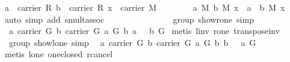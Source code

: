 \begin{isabellebody}
{\isachardoublequoteopen}{\isacharbrackleft}{\isacharbar}\ a\ {\isasymin}\ carrier\ R{\isacharsemicolon}\ b\ {\isasymin}\ carrier\ R{\isacharsemicolon}\ x\ {\isasymin}\ carrier\ M\ {\isacharbar}{\isacharbrackright}\ {\isacharequal}{\isacharequal}{\isachargreater}\isanewline
\ \ \ \ \ \ a\ {\isasymodot}\isactrlbsub M\isactrlesub \ {\isacharparenleft}b\ {\isasymodot}\isactrlbsub M\isactrlesub \ x{\isacharparenright}\ {\isacharequal}\ {\isacharparenleft}a\ {\isasymotimes}\ b{\isacharparenright}\ {\isasymodot}\isactrlbsub M\isactrlesub \ x\ {\isachardoublequoteclose}\isanewline
%
\isadelimproof
%
\endisadelimproof
%
\isatagproof
{}\isamarkupfalse%
\ {\isacharparenleft}auto\ simp\ add{\isacharcolon}\ smult{\isacharunderscore}assoc{}{\isacharparenright}%
\endisatagproof
{\isafoldproof}%
%
\isadelimproof
\isanewline
%
\endisadelimproof
\ \ \ \ \ \ \ \ \ \ \ \ \ \isanewline
\isanewline
{}\isamarkupfalse%
\ {\isacharparenleft}\ group{\isacharparenright}\ show{\isacharunderscore}r{\isacharunderscore}one\ {\isacharbrackleft}simp{\isacharbrackright}{\isacharcolon}\isanewline
\ \ {\isachardoublequoteopen}{\isasymlbrakk}a{\isasymin}\ carrier\ G{\isacharsemicolon}\ b{\isasymin}\ carrier\ G{\isasymrbrakk}{\isasymLongrightarrow}\ {\isacharparenleft}a\ {\isasymotimes}\isactrlbsub G\isactrlesub \ b{\isacharequal}\ a{\isacharparenright}\ {\isacharequal}\ {\isacharparenleft}\ b{\isacharequal}\ {\isasymone}\isactrlbsub G\isactrlesub {\isacharparenright}{\isachardoublequoteclose}\isanewline
%
\isadelimproof
%
\endisadelimproof
%
\isatagproof
{}\isamarkupfalse%
\ {\isacharparenleft}metis\ l{\isacharunderscore}inv\ r{\isacharunderscore}one\ transpose{\isacharunderscore}inv{\isacharparenright}%
\endisatagproof
{\isafoldproof}%
%
\isadelimproof
\isanewline
%
\endisadelimproof
\isanewline
\isanewline
{}\isamarkupfalse%
\ {\isacharparenleft}\ group{\isacharparenright}\ show{\isacharunderscore}l{\isacharunderscore}one\ {\isacharbrackleft}simp{\isacharbrackright}{\isacharcolon}\isanewline
\ \ {\isachardoublequoteopen}{\isasymlbrakk}a{\isasymin}\ carrier\ G{\isacharsemicolon}\ b{\isasymin}\ carrier\ G{\isasymrbrakk}{\isasymLongrightarrow}\ {\isacharparenleft}a\ {\isasymotimes}\isactrlbsub G\isactrlesub \ b{\isacharequal}\ b{\isacharparenright}\ {\isacharequal}\ {\isacharparenleft}\ a{\isacharequal}\ {\isasymone}\isactrlbsub G\isactrlesub {\isacharparenright}{\isachardoublequoteclose}\isanewline
%
\isadelimproof
%
\endisadelimproof
%
\isatagproof
{}\isamarkupfalse%
\ {\isacharparenleft}metis\ l{\isacharunderscore}one\ one{\isacharunderscore}closed\ r{\isacharunderscore}cancel{\isacharparenright}%

\end{isabellebody}
